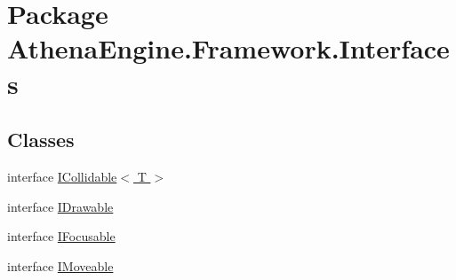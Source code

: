 \hypertarget{namespace_athena_engine_1_1_framework_1_1_interfaces}{\section{Package Athena\-Engine.\-Framework.\-Interfaces}
\label{namespace_athena_engine_1_1_framework_1_1_interfaces}
}
\subsection*{Classes}
\begin{DoxyCompactItemize}
\item 
interface \hyperlink{interface_athena_engine_1_1_framework_1_1_interfaces_1_1_i_collidable_3_01_t_01_4}{I\-Collidable$<$ T $>$}
\item 
interface \hyperlink{interface_athena_engine_1_1_framework_1_1_interfaces_1_1_i_drawable}{I\-Drawable}
\item 
interface \hyperlink{interface_athena_engine_1_1_framework_1_1_interfaces_1_1_i_focusable}{I\-Focusable}
\item 
interface \hyperlink{interface_athena_engine_1_1_framework_1_1_interfaces_1_1_i_moveable}{I\-Moveable}
\end{DoxyCompactItemize}
